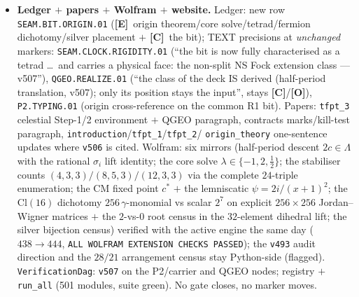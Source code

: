 \documentclass[11pt]{article}
\providecommand{\mE}{\textbf{[E]}}\providecommand{\mC}{\textbf{[C]}}
\providecommand{\mO}{\textbf{[O]}}\providecommand{\mX}{\textbf{[X]}}
\begin{document}
\begin{itemize}[leftmargin=1.5em]
independently computed converses of ONE equivalence, no circle. \emph{Fermion dichotomy (Part B)}:
central arrangement (shift by $8$): $\tilde U^2=256\,\gamma_1\cdots\gamma_{16}\Rightarrow
U^2=(-1)^F$, nonsplit $\Z_4$, $2$ roots in the $32$-element dihedral lift (the $\Z_8$ tower); edge
arrangement (reflection $j\mapsto4{-}j$, fixed sites $=$ non-marks $=$ the silver $\{0,\infty\}$
between neighbour marks): the implementer EXISTS but $\tilde U_e^2=+2^7\cdot\mathbf1\Rightarrow
U^2=+1$, the extension SPLITS, $0$ roots, no $\Z_8$; one-particle $(\lambda^2{+}1)^8$ vs
$(\lambda^2{-}1)^8$; census: all $28$ shift-invariant $4$-sets cross (central type), all $21$
mark-free reflection-invariant sets do not; robust at $8$ sites; R-sector edge control splits too
--- the bit IS a physical extension class (Fidkowski--Kitaev-type): distinguished, but not derived
(WHICH class nature realises stays the input). \emph{Silver placement}: $\{\pm1,\pm(3{+}2\sqrt2)\}$
$=$ ``$\tau=i$ with deck $=$ a non-CM-fixed half-period translation'' (all $8$ bijections
$\to\sigma_2/\sigma_3$, never $\sigma_1$) --- the in-family witness: TAUTOLOGY REFUTED. \emph{The
one \mC\ rest (verbatim)}: the alignment bit remains a carrier datum; ``no tautology --- the origin
forces the CLASS of the deck (half-period translation), not its POSITION''. No overclaim.
\item \textbf{Ledger $+$ papers $+$ Wolfram $+$ website.} Ledger: new row
\texttt{SEAM.BIT.ORIGIN.01} (\mE\ origin theorem/core solve/tetrad/fermion dichotomy/silver
placement $+$ \mC\ the bit); TEXT precisions at \emph{unchanged} markers:
\texttt{SEAM.CLOCK.RIGIDITY.01} (``the bit is now fully characterised as a tetrad \dots\ and
carries a physical face: the non-split NS Fock extension class --- v507''),
\texttt{QGEO.REALIZE.01} (``the class of the deck IS derived (half-period translation, v507); only
its position stays the input'', stays \mC/\mO), \texttt{P2.TYPING.01} (origin cross-reference on
the common R1 bit). Papers: \texttt{tfpt\_3} celestial Step-1/2 environment $+$ QGEO paragraph,
contracts marks/kill-test paragraph, \texttt{introduction}/\texttt{tfpt\_1}/\texttt{tfpt\_2}/%
\texttt{origin\_theory} one-sentence updates where \texttt{v506} is cited. Wolfram: six mirrors
(half-period descent $2c\in\Lambda$ with the rational $\sigma_i$ lift identity; the core solve
$\lambda\in\{-1,2,\tfrac12\}$; the stabiliser counts $(4,3,3)/(8,5,3)/(12,3,3)$ via the complete
$24$-triple enumeration; the CM fixed point $c^*$ $+$ the lemniscatic $\psi=2i/(x{+}1)^2$; the
$\mathrm{Cl}(16)$ dichotomy $256\,\gamma$-monomial vs scalar $2^7$ on explicit $256{\times}256$
Jordan--Wigner matrices $+$ the $2$-vs-$0$ root census in the $32$-element dihedral lift; the
silver bijection census) verified with the active engine the same day ($438\to444$, \texttt{ALL
WOLFRAM EXTENSION CHECKS PASSED}); the \texttt{v493} audit direction and the $28/21$ arrangement
census stay Python-side (flagged). \texttt{VerificationDag}: \texttt{v507} on the P2/carrier and
QGEO nodes; registry $+$ \texttt{run\_all} (501 modules, suite green). No gate closes, no marker
moves.
\end{itemize}
\end{document}
